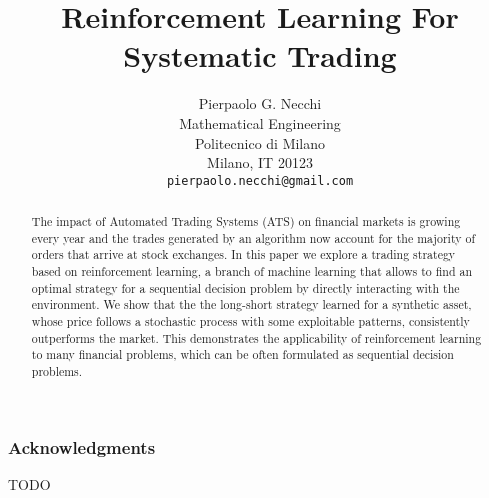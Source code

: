\documentclass{article} %
\title{Reinforcement Learning For Systematic Trading}
\author{%
Pierpaolo G. Necchi\\
Mathematical Engineering\\
Politecnico di Milano\\
Milano, IT 20123 \\
\texttt{pierpaolo.necchi@gmail.com}
}
\begin{document}
\maketitle

\begin{abstract}
	The impact of Automated Trading Systems (ATS) on financial markets is growing every year and the trades generated by an algorithm now account for the majority of orders that arrive at stock exchanges. In this paper we explore a trading strategy based on reinforcement learning, a branch of machine learning that allows to find an optimal strategy for a sequential decision problem by directly interacting with the environment. We show that the the long-short strategy learned for a synthetic asset, whose price follows a stochastic process with some exploitable patterns, consistently outperforms the market. This demonstrates the applicability of reinforcement learning to many financial problems, which can be often formulated as sequential decision problems. 
\end{abstract}


\clearpage










\subsubsection*{Acknowledgments}

TODO

\clearpage


\end{document}
